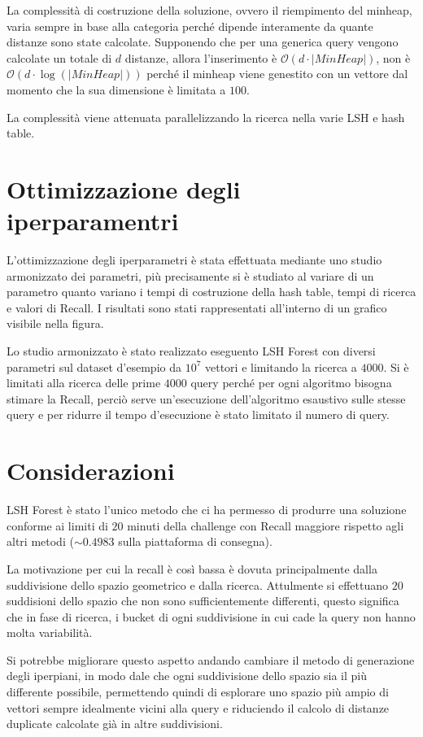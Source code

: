La complessità di costruzione della soluzione, ovvero il riempimento del minheap,
varia sempre in base alla categoria perché dipende interamente da quante distanze 
sono state calcolate. Supponendo che per una generica query vengono calcolate un 
totale di $d$ distanze, allora l'inserimento è $\mathcal{O}(d\cdot |MinHeap|)$, non è 
$\mathcal{O}(d\cdot \log(|MinHeap|))$ perché il minheap viene genestito con un vettore dal 
momento che la sua dimensione è limitata a $100$.

La complessità viene attenuata parallelizzando la ricerca nella varie LSH e hash table.

\section{Ottimizzazione degli iperparamentri}
L'ottimizzazione degli iperparametri è stata effettuata mediante uno studio 
armonizzato dei parametri, più precisamente si è studiato al variare di un parametro
quanto variano i tempi di costruzione della hash table, tempi di ricerca e valori 
di Recall. I risultati sono stati rappresentati all'interno di un grafico visibile 
nella figura.

Lo studio armonizzato è stato realizzato eseguento LSH Forest con diversi parametri 
sul dataset d'esempio da $10^7$ vettori e limitando la ricerca a $4000$.
Si è limitati alla ricerca delle prime $4000$ query perché per ogni algoritmo bisogna 
stimare la Recall, perciò serve un'esecuzione dell'algoritmo esaustivo sulle stesse 
query e per ridurre il tempo d'esecuzione è stato limitato il numero di query. 


\section{Considerazioni}
LSH Forest è stato l'unico metodo che ci ha permesso di produrre una soluzione 
conforme ai limiti di $20$ minuti della challenge con Recall maggiore rispetto
agli altri metodi ($\sim 0.4983$ sulla piattaforma di consegna). 

La motivazione per cui la recall è così bassa è dovuta principalmente dalla suddivisione 
dello spazio geometrico e dalla ricerca. Attulmente si effettuano $20$ suddisioni
dello spazio che non sono sufficientemente differenti, questo significa che in 
fase di ricerca, i bucket di ogni suddivisione in cui cade la query non hanno molta 
variabilità.

Si potrebbe migliorare questo aspetto andando cambiare il metodo di generazione 
degli iperpiani, in modo dale che ogni suddivisione dello spazio sia il più differente 
possibile, permettendo quindi di esplorare uno spazio più ampio di vettori 
sempre idealmente vicini alla query e riduciendo il calcolo di distanze duplicate 
calcolate già in altre suddivisioni. 


